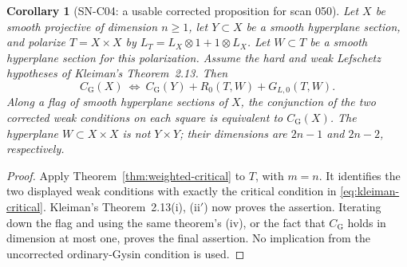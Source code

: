 \documentclass[11pt,a4paper]{article}
\newtheorem{corollary}[theorem]{Corollary}
\theoremstyle{definition}
\theoremstyle{remark}
\begin{document}
\begin{corollary}[SN-C04: a usable corrected proposition for scan 050]
\label{cor:corrected-scan050}
Let $X$ be smooth projective of dimension $n\ge1$, let $Y\subset X$
be a smooth hyperplane section, and polarize $T=X\times X$ by
$L_T=L_X\otimes1+1\otimes L_X$.  Let $W\subset T$ be a smooth
hyperplane section for this polarization.  Assume the hard and weak
Lefschetz hypotheses of Kleiman's Theorem~2.13.  Then
\begin{equation}
 \boxed{\quad C_{\mathrm G}(X)\ \Longleftrightarrow\
 C_{\mathrm G}(Y)+R_0(T,W)+G_{L,0}(T,W).\quad}
 \label{eq:corrected-scan050}
\end{equation}
Along a flag of smooth hyperplane sections of $X$, the conjunction
of the two corrected weak conditions on each square is equivalent
to $C_{\mathrm G}(X)$.  The hyperplane $W\subset X\times X$
is not $Y\times Y$; their dimensions are $2n-1$ and $2n-2$,
respectively.
\end{corollary}
\begin{proof}
Apply Theorem~\ref{thm:weighted-critical} to $T$, with $m=n$.
It identifies the two displayed weak conditions with exactly the
critical condition in \eqref{eq:kleiman-critical}.  Kleiman's
Theorem~2.13(i), (ii$'$) now proves the assertion.  Iterating down
the flag and using the same theorem's (iv), or the fact that
$C_{\mathrm G}$ holds in dimension at most one, proves the final
assertion.  No implication from the uncorrected ordinary-Gysin
condition is used.
\end{proof}
\end{document}
